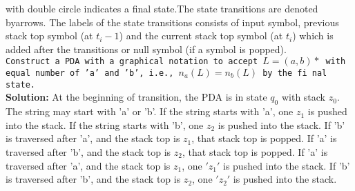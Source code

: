 \documentclass[9pt]{beamer}
\begin{document}
\begin{frame}
 with double circle indicates a final state.The state transitions are denoted byarrows. The labels of the state transitions consists of input symbol, previous stack top symbol (at $t_i-1$) and the current stack top symbol (at $t_i$) which is added after the transitions or null symbol (if a symbol is popped).\\

\hspace*{0.1cm} \texttt{\small{Construct a PDA with a graphical notation to accept $L = (a, b)*$ with equal number of 'a' and 'b', i.e., $n_a(L) = n_b(L)$ by the fi nal state.}}\\

\textbf{Solution: }At the beginning of transition, the PDA is in state $q_0$ with stack $z_0$. The string may start with
'a' or 'b'. If the string starts with 'a', one $z_1$ is pushed into the stack. If the string starts with 'b', one $z_2$
is pushed into the stack. If 'b' is traversed after 'a', and the stack top is $z_1$, that stack top is popped. If 'a'
is traversed after 'b', and the stack top is $z_2$, that stack top is popped. If 'a' is traversed after 'a', and the
stack top is $z_1$, one $'z_1'$ is pushed into the stack. If 'b' is traversed after 'b', and the stack top is $z_2$, one
$'z_2'$ is pushed into the stack.\\
\end{frame}
\end{document}
